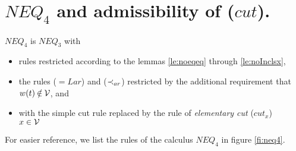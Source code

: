 \section{$NEQ_4$ and admissibility of ($cut$).}
%
\begin{DEFINITION}\label{de:neq4}
$NEQ_4$ is $NEQ_3$ with 
\begin{itemize}\MyLPar
\item rules restricted
according to the lemmas \ref{le:noeqeq} through \ref{le:noInclsx},
\item the rules ($={Lar}$) and ($\mathbin{\prec}_{ar}$) restricted by the additional requirement that 
$w(t)\not\in\Vars$, and
\item
with the simple cut rule  replaced by the rule of {\em elementary cut}
 ($cut_x$)\ \
\ $x\in{\cal V}$ \label{ru:cutx} 
\end{itemize}
\end{DEFINITION}
%
\noindent
For easier reference, we list the rules of the calculus $NEQ_4$ in figure
\ref{fi:neq4}.

